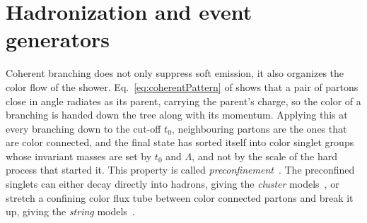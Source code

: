 %

\section{Hadronization and event generators}
\label{sec:eventGenerators}
Coherent branching does not only suppress soft emission, it also organizes the color flow of the shower.
%
Eq.~\ref{eq:coherentPattern} of shows that a pair of partons close in angle radiates as its parent, carrying the parent's charge, so the color of a branching is handed down the tree along with its momentum.
%
Applying this at every branching down to the cut-off \(t_0\), neighbouring partons are the ones that are color connected, and the final state has sorted itself into color singlet groups whose invariant masses are set by \(t_0\) and \(\Lambda\), and not by the scale of the hard process that started it.
%
This property is called \emph{preconfinement}~\cite{Ellis_Stirling_Webber_1996}.
%
The preconfined singlets can either decay directly into hadrons, giving the \emph{cluster} models~\cite{Webber:147786}, or stretch a confining color flux tube between color connected partons and break it up, giving the \emph{string} models~\cite{ANDERSSON198331}. 

